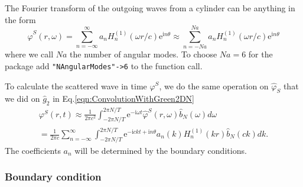 \documentclass[ 12pt, a4paper]{article}
\newcommand{\be}{\begin{equation}}
\newcommand{\en}{\end{equation}}
\newcommand{\ii}{\textrm{i}}
\newcommand{\ee}{\textrm{e}}
\begin{document}
The Fourier transform of the outgoing waves from a cylinder can be anything in the form
\be
\hat \varphi^S(r, \omega) = \sum_{n= -\infty}^{ \infty} a_n H^{(1)}_n( \omega r/c) \ee^{\ii n \theta} \approx  \sum_{n= -Na}^{ Na} a_n H^{(1)}_n( \omega r/c) \ee^{\ii n \theta}
\label{eqn:ScatteredForm}
\en
where we call $Na$ the number of angular modes. To choose $Na=6$ for the package add \texttt{"NAngularModes"->6} to the function call.

To calculate the scattered wave in time $\varphi^S$, we do the same operation on $\hat \varphi_S$ that we did on $\hat g_2$ in Eq.\eqref{eqn:ConvolutionWithGreen2DN}
\begin{multline}
 \varphi^S(r, t)  \approx \frac{1}{2 \pi c^2} \int_{- 2 \pi N/T}^{ 2 \pi N/T} \ee^{-\ii \omega t}  \hat \varphi^S(r ,\omega) \hat b_N(\omega)  d \omega
 \\
    = \frac{1}{2\pi c} \sum_{n= -\infty}^{ \infty}  \int_{- 2 \pi N/T}^{ 2 \pi N/T}   \ee^{ -\ii c k t + \ii n \theta } a_n(k) H^{(1)}_n( k r)  \hat b_N(c k)  d k.
\label{eqn:ScatteredConvolutionN}
\end{multline}
The coefficients $a_n$ will be determined by the boundary conditions.


\subsubsection{Boundary condition}
\end{document}
